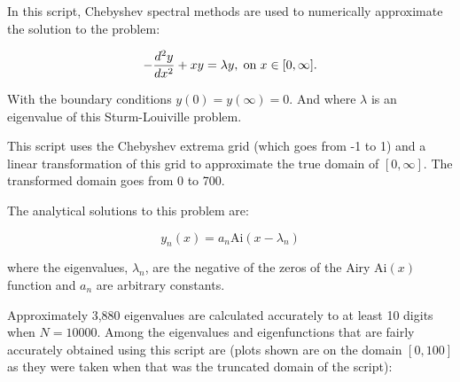 \documentclass[12pt,a4paper,openright]{article}
\begin{document}
	In this script, Chebyshev spectral methods are used to numerically approximate the solution to the problem:
	
	\[
	- \dfrac{d^2 y}{dx^2} + xy = \lambda y, \hspace{0.1cm}\mathrm{on} \hspace{0.1cm} x\in[0,\infty].
	\]
	
	With the boundary conditions $y(0)=y(\infty)=0$. And where $\lambda$ is an eigenvalue of this Sturm-Louiville problem. 
	
	This script uses the Chebyshev extrema grid (which goes from -1 to 1) and a linear transformation of this grid to approximate the true domain of $[0,\infty]$. The transformed domain goes from 0 to 700. 
		
	The analytical solutions to this problem are:
	
	\[
	y_n(x) = a_n \mathrm{Ai}(x-\lambda_n)
	\]
	
	where the eigenvalues, $\lambda_n$, are the negative of the zeros of the Airy $\mathrm{Ai}(x)$ function and $a_n$ are arbitrary constants. 
	
	Approximately 3,880 eigenvalues are calculated accurately to at least 10 digits when $N=10000$. Among the eigenvalues and eigenfunctions that are fairly accurately obtained using this script are (plots shown are on the domain $ [0,100] $ as they were taken when that was the truncated domain of the script):
\end{document}
